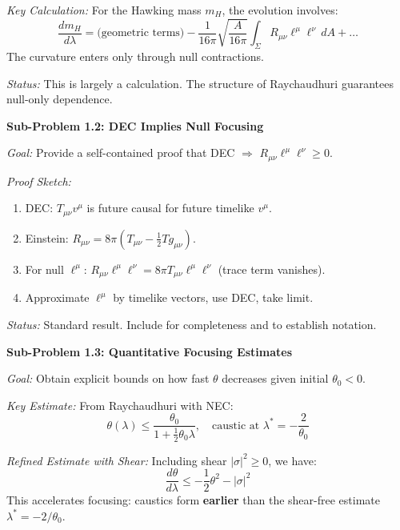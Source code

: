 \textit{Key Calculation:} For the Hawking mass $m_H$, the evolution involves:
\begin{equation}
    \frac{dm_H}{d\lambda} = \text{(geometric terms)} - \frac{1}{16\pi}\sqrt{\frac{A}{16\pi}} \int_\Sigma R_{\mu\nu}\ell^\mu\ell^\nu \, dA + \ldots
\end{equation}
The curvature enters only through null contractions.

\textit{Status:} This is largely a calculation. The structure of Raychaudhuri guarantees null-only dependence.

\textbf{Sub-Problem 1.2: DEC Implies Null Focusing}

\textit{Goal:} Provide a self-contained proof that DEC $\Rightarrow$ $R_{\mu\nu}\ell^\mu\ell^\nu \geq 0$.

\textit{Proof Sketch:}
\begin{enumerate}
    \item DEC: $T_{\mu\nu}v^\mu$ is future causal for future timelike $v^\mu$.
    \item Einstein: $R_{\mu\nu} = 8\pi(T_{\mu\nu} - \frac{1}{2}Tg_{\mu\nu})$.
    \item For null $\ell^\mu$: $R_{\mu\nu}\ell^\mu\ell^\nu = 8\pi T_{\mu\nu}\ell^\mu\ell^\nu$ (trace term vanishes).
    \item Approximate $\ell^\mu$ by timelike vectors, use DEC, take limit.
\end{enumerate}

\textit{Status:} Standard result. Include for completeness and to establish notation.

\textbf{Sub-Problem 1.3: Quantitative Focusing Estimates}

\textit{Goal:} Obtain explicit bounds on how fast $\theta$ decreases given initial $\theta_0 < 0$.

\textit{Key Estimate:} From Raychaudhuri with NEC:
\begin{equation}
    \theta(\lambda) \leq \frac{\theta_0}{1 + \frac{1}{2}\theta_0\lambda}, \quad \text{caustic at } \lambda^* = -\frac{2}{\theta_0}
\end{equation}

\textit{Refined Estimate with Shear:} Including shear $|\sigma|^2 \geq 0$, we have:
\begin{equation}
    \frac{d\theta}{d\lambda} \leq -\frac{1}{2}\theta^2 - |\sigma|^2
\end{equation}
This accelerates focusing: caustics form \textbf{earlier} than the shear-free estimate $\lambda^* = -2/\theta_0$.

